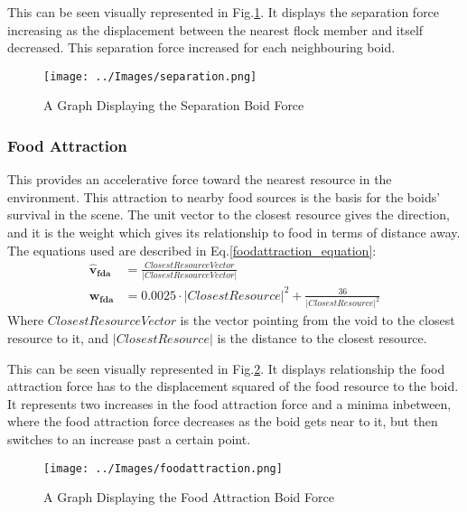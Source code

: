 This can be seen visually represented in Fig.\ref{fig:separation}. It displays the separation force increasing as the displacement between the nearest flock member and itself decreased. This separation force increased for each neighbouring boid.
\begin{figure}[H]
	\texttt{[image: ../Images/separation.png]}
	\caption{A Graph Displaying the Separation Boid Force}
	\label{fig:separation}
\end{figure}

\subsubsection{Food Attraction}
This provides an accelerative force toward the nearest resource in the environment. This attraction to nearby food sources is the basis for the boids' survival in the scene. The unit vector to the closest resource gives the direction, and it is the weight which gives its relationship to food in terms of distance away. The equations used are described in Eq.\ref{foodattraction_equation}:
\begin{equation}
\begin{split}
\boldsymbol{\hat{v}_{fda}} &= \frac{ClosestResourceVector} {|ClosestResourceVector|} \\
\boldsymbol{w_{fda}} &= 0.0025 \cdot |ClosestResource|^2 + \frac{36} {|ClosestResource|^2}
\end{split}
\label{foodattraction_equation}
\end{equation}
Where $ClosestResourceVector$ is the vector pointing from the void to the closest resource to it, and $|ClosestResource|$ is the distance to the closest resource.

This can be seen visually represented in Fig.\ref{fig:foodattraction}. It displays relationship the food attraction force has to the displacement squared of the food resource to the boid. It represents two increases in the food attraction force and a minima inbetween, where the food attraction force decreases as the boid gets near to it, but then switches to an increase past a certain point.
\begin{figure}[H]
	\texttt{[image: ../Images/foodattraction.png]}
	\caption{A Graph Displaying the Food Attraction Boid Force}
	\label{fig:foodattraction}
\end{figure}

